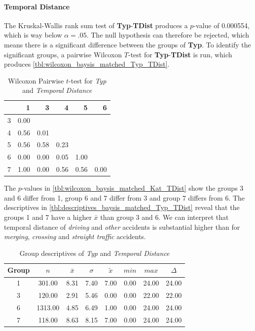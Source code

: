 \paragraph{Temporal Distance}
The Kruskal-Wallis rank sum test of \textbf{Typ}-\textbf{TDist} produces a $p$-value of 0.000554, which is way below $\alpha=.05$. The null hypothesis can therefore be rejected, which means there is a significant difference between the groups of \textbf{Typ}. To identify the significant groups, a pairwise Wilcoxon $T$-test for \textbf{Typ}-\textbf{TDist} is run, which produces \autoref{tbl:wilcoxon_baysis_matched_Typ_TDist}. 
\begin{table}[ht]
	\small
	\centering
	\begin{tabular}{rrrrrr}
		\toprule
		& 1 & 3 & 4 & 5 & 6 \\ 
		\midrule
		3 & 0.00 &  &  &  &  \\ 
		4 & 0.56 & 0.01 &  &  &  \\ 
		5 & 0.56 & 0.58 & 0.23 &  &  \\ 
		6 & 0.00 & 0.00 & 0.05 & 1.00 &  \\ 
		7 & 1.00 & 0.00 & 0.56 & 0.56 & 0.00 \\ 
		\bottomrule
	\end{tabular}
	\caption{Wilcoxon Pairwise $t$-test for \textit{Typ} and \textit{Temporal Distance}}
	\label{tbl:wilcoxon_baysis_matched_Typ_TDist}
\end{table}
The $p$-values in \autoref{tbl:wilcoxon_baysis_matched_Kat_TDist} show the groups 3 and 6 differ from 1, group 6 and 7 differ from 3 and group 7 differs from 6. The descriptives in \autoref{tbl:descriptives_baysis_matched_Typ_TDist} reveal that the groups 1 and 7 have a higher $\bar{x}$ than group 3 and 6. We can interpret that temporal distance of \textit{driving} and \textit{other} accidents is substantial higher than for \textit{merging}, \textit{crossing} and \textit{straight traffic} accidents. 
\begin{table}[ht]
	\small
	\centering
	\begin{tabular}{c|c|c|c|c|c|c|c}
		\toprule
		Group & $n$ & $\bar{x}$ & $\sigma$ & $\tilde{x}$ & $min$ & $max$ & $\Delta$ \\ 
		\midrule
		1 & 301.00 & 8.31 & 7.40 & 7.00 & 0.00 & 24.00 & 24.00 \\ 
		3 & 120.00 & 2.91 & 5.46 & 0.00 & 0.00 & 22.00 & 22.00 \\ 
		6 & 1313.00 & 4.85 & 6.49 & 1.00 & 0.00 & 24.00 & 24.00 \\ 
		7 & 118.00 & 8.63 & 8.15 & 7.00 & 0.00 & 24.00 & 24.00 \\ 
		\bottomrule
	\end{tabular}
	\caption{Group descriptives of \textit{Typ} and \textit{Temporal Distance}}
	\label{tbl:descriptives_baysis_matched_Typ_TDist}
\end{table}

